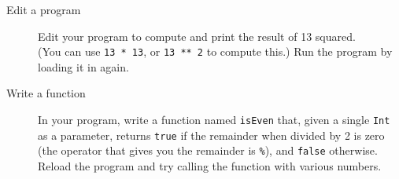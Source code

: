 \documentclass[12pt,a4paper,times]{article}
\begin{document}
\begin{description}
\item[Edit a program] Edit your program to compute and print the result of 13 squared.\\
(You can use \verb!13 * 13!, or \verb!13 ** 2! to compute this.) Run the program by loading it in again.

\item[Write a function] In your program, write a function named \verb!isEven! that, given a single \verb!Int! 
as a parameter, returns \verb!true! if the remainder when divided by 2 is zero 
(the operator that gives you the remainder is \verb!%!), and \verb!false! otherwise. 
Reload the program and try calling the function with various numbers.
\end{description}
\end{document}
